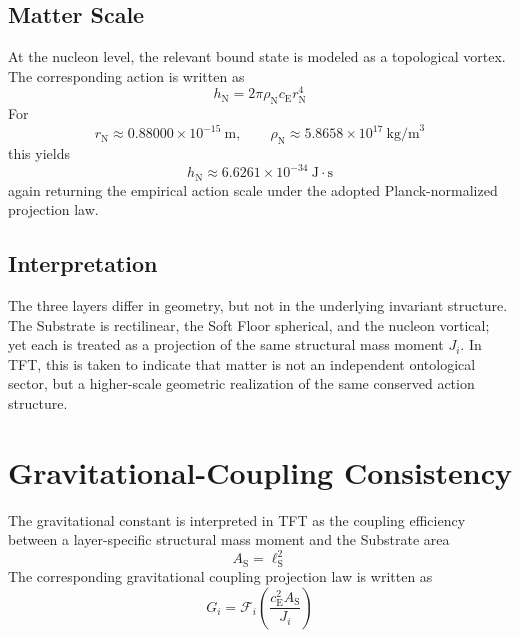 \subsection{Matter Scale}
At the nucleon level, the relevant bound state is modeled as a topological vortex. The corresponding action is written as
\begin{equation}
    h_{\mathrm{N}} = 2\pi \rho_{\mathrm{N}} c_{\mathrm{E}} r_{\mathrm{N}}^4
\end{equation}
For
\begin{equation}
    r_{\mathrm{N}} \approx 0.88000 \times 10^{-15}\ \text{m}, \qquad \rho_{\mathrm{N}} \approx 5.8658 \times 10^{17}\ \text{kg/m}^3
\end{equation}
this yields
\begin{equation}
    h_{\mathrm{N}} \approx 6.6261 \times 10^{-34}\ \text{J}\cdot\text{s}
\end{equation}
again returning the empirical action scale under the adopted Planck-normalized projection law.

\subsection{Interpretation}
The three layers differ in geometry, but not in the underlying invariant structure. The Substrate is rectilinear, the Soft Floor spherical, and the nucleon vortical; yet each is treated as a projection of the same structural mass moment $J_i$. In TFT, this is taken to indicate that matter is not an independent ontological sector, but a higher-scale geometric realization of the same conserved action structure.

\section{Gravitational-Coupling Consistency}
The gravitational constant is interpreted in TFT as the coupling efficiency between a layer-specific structural mass moment and the Substrate area
\begin{equation}
    A_{\mathrm{S}} = \ell_{\mathrm{S}}^2
\end{equation}
The corresponding gravitational coupling projection law is written as
\begin{equation}
    G_i = \mathcal{F}_i \left(\frac{c_{\mathrm{E}}^2 A_{\mathrm{S}}}{J_i}\right)
\end{equation}

